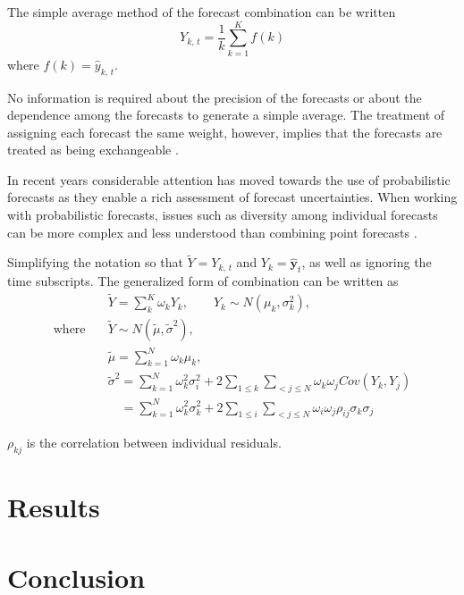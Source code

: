 \documentclass[
a4paper, %
12pt, %
]{CascadeAnalyticsWPS}
\begin{document}
The simple average method of the forecast combination can be written 
\begin{equation}
Y_{k,\,t} = \frac{1}{k}\sum\limits_{k =1}^{K}f(k)
\end{equation}
where $f(k) = \hat{y}_{k,\,t}$.

No information is required about the precision of the forecasts or about the dependence among the forecasts to generate a simple average. The treatment of assigning each forecast the same weight, however, implies that the forecasts are treated as being exchangeable \citep{clemen86}. 

In recent years considerable attention has moved towards the use of probabilistic forecasts \citep{gaglianone2014, KAPETANIOS2015, martin2022} as they enable a rich assessment of forecast uncertainties. When working with probabilistic forecasts, issues such as diversity among individual forecasts can be more complex and less understood than combining point forecasts \citep{ranjan2010}.



Simplifying the notation so that $\tilde{Y} = Y_{k,\,t}$ and $Y_{k} = \hat{\mathbf{{y}}}_{t}$, as well as ignoring the time subscripts. The generalized form of combination can be written as
\begin{equation}
\begin{aligned}
	&\tilde{Y} = \sum_{k}^{K} \omega_{k}Y_{k}, \qquad Y_{k} \sim N(\mu_{k}, \sigma_{k}^{2}), \\
	\text{where} \quad & \tilde{Y} \sim N(\tilde{\mu}, \tilde{\sigma}^{2}), \\
	&\tilde{\mu} = \sum_{k=1}^{N} \omega_{k} \mu_{k}, \\
	& \tilde{\sigma}^2 = \sum_{k=1}^{N} \omega_{k}^{2}\sigma_{i}^{2} + 2 \sum_{1 \leq k} \sum_{<j \leq N}\omega_{k} \omega_{j}Cov(Y_{k},Y_{j})\\
	& \quad = \sum_{k=1}^{N} \omega_{k}^{2}\sigma_{k}^{2} + 2 \sum_{1 \leq i} \sum_{<j \leq N} \omega_{i} \omega_{j}\rho_{ij}\sigma_{k}\sigma_{j} 
\end{aligned}
\end{equation}

$\rho_{kj}$ is the correlation between individual residuals.

\section{Results}

\section{Conclusion}


\end{document}
